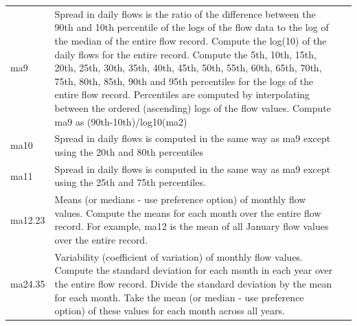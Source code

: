 \documentclass[a4paper,11pt]{article}\usepackage[]{graphicx}\usepackage[]{color}
\begin{document}
\begin{table}[ht]
\begin{threeparttable}[b]
\begin{tabularx}{\textwidth}{lXl}
  ma9 & Spread in daily flows is the ratio of the difference between the 90th and 10th percentile of the logs of the flow data to the log of the median of the entire flow record. Compute the log(10) of the daily flows for the entire record. Compute the 5th, 10th, 15th, 20th, 25th, 30th, 35th, 40th, 45th, 50th, 55th, 60th, 65th, 70th, 75th, 80th, 85th, 90th and 95th percentiles for the logs of the entire flow record. Percentiles are computed by interpolating between the ordered (ascending) logs of the flow values. Compute ma9 as (90th-10th)/log10(ma2) \\
  ma10 & Spread in daily flows is computed in the same way as ma9 except using the 20th and 80th percentiles \\
  ma11 & Spread in daily flows is computed in the same way as ma9 except using the 25th and 75th percentiles. \\
  ma12.23 & Means (or medians - use preference option) of monthly flow values. Compute the means for each month over the entire flow record. For example, ma12 is the mean of all January flow values over the entire record. \\
  ma24.35 & Variability (coefficient of variation) of monthly flow values. Compute the standard deviation for each month in each year over the entire flow record. Divide the standard deviation by the mean for each month. Take the mean (or median - use preference option) of these values for each month across all years. \\
  \hline
  \end{tabularx}
  \end{threeparttable}
\end{table}
\end{document}
